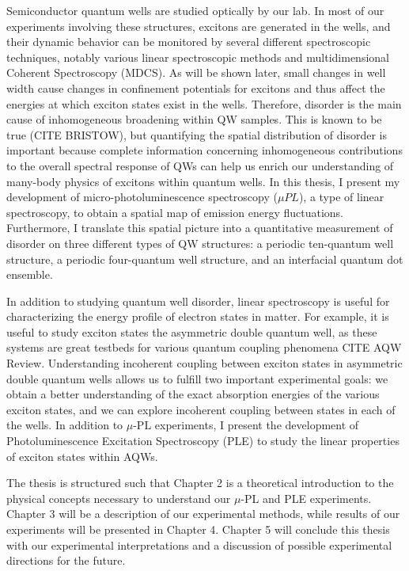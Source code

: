 \indent Semiconductor quantum wells are studied optically by our lab. In most of our experiments involving these structures, excitons are generated in the wells, and their dynamic behavior can be monitored by several different spectroscopic techniques, notably various linear spectroscopic methods and multidimensional Coherent Spectroscopy (MDCS). As will be shown later, small changes in well width cause changes in confinement potentials for excitons and thus affect the energies at which exciton states exist in the wells. Therefore, disorder is the main cause of inhomogeneous broadening within QW samples. This is known to be true (CITE BRISTOW), but quantifying the spatial distribution of disorder is important because complete information concerning inhomogeneous contributions to the overall spectral response of QWs can help us enrich our understanding of many-body physics of excitons within quantum wells. In this thesis, I present my development of  micro-photoluminescence spectroscopy ($\mu PL$), a type of linear spectroscopy, to obtain a spatial map of emission energy fluctuations. Furthermore, I translate this spatial picture into a quantitative measurement of disorder on three different types of QW structures: a periodic ten-quantum well structure, a periodic four-quantum well structure, and an interfacial quantum dot ensemble. 

\indent In addition to studying quantum well disorder, linear spectroscopy is useful for characterizing the energy profile of electron states in matter. For example, it is useful to study exciton states the asymmetric double quantum well, as these systems are great testbeds for various quantum coupling phenomena CITE AQW Review. Understanding incoherent coupling between exciton states in asymmetric double quantum wells allows us to fulfill two important experimental goals: we obtain a better understanding of the exact absorption energies of the various exciton states, and we can explore incoherent coupling between states in each of the wells. In addition to $\mu$-PL experiments, I present the development of Photoluminescence Excitation Spectroscopy (PLE) to study the linear properties of exciton states within AQWs.

\indent The thesis is structured such that Chapter 2 is a theoretical introduction to the physical concepts necessary to understand our $\mu$-PL and PLE experiments. Chapter 3 will be a description of our experimental methods, while results of our experiments will be presented in Chapter 4. Chapter 5 will conclude this thesis with our experimental interpretations and a discussion of possible experimental directions for the future. 







